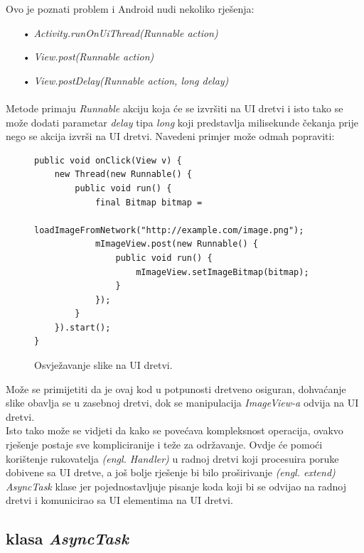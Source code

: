 \documentclass[times, utf8, zavrsni]{fer}
\begin{document}
Ovo je poznati problem i Android nudi nekoliko rješenja:

\begin{itemize}
\item[•] \textit{Activity.runOnUiThread(Runnable action)}
\item[•] \textit{View.post(Runnable action)}
\item[•] \textit{View.postDelay(Runnable action, long delay)}
\end{itemize}
\paragraph{}
Metode primaju \textit{Runnable} akciju koja će se izvršiti na UI dretvi i isto tako se može dodati parametar \textit{delay} tipa \textit{long} koji predstavlja milisekunde čekanja prije nego se akcija izvrši na UI dretvi.\newpage 
Navedeni primjer može odmah popraviti:

\begin{figure}[ht!]
\begin{lstlisting}
public void onClick(View v) {
    new Thread(new Runnable() {
        public void run() {
            final Bitmap bitmap =
                    loadImageFromNetwork("http://example.com/image.png");
            mImageView.post(new Runnable() {
                public void run() {
                    mImageView.setImageBitmap(bitmap);
                }
            });
        }
    }).start();
}
\end{lstlisting}
\caption{Osvježavanje slike na UI dretvi.}
\label{overflow}
\end{figure}

Može se primijetiti da je ovaj kod u potpunosti dretveno osiguran, dohvaćanje slike obavlja se u zasebnoj dretvi, dok se manipulacija \textit{ImageView-a} odvija na UI dretvi.\\

Isto tako može se vidjeti da kako se povećava kompleksnost operacija, ovakvo rješenje postaje sve kompliciranije i teže za održavanje. Ovdje će pomoći korištenje rukovatelja \textit{(engl. Handler)} u radnoj dretvi koji procesuira poruke dobivene sa UI dretve, a još bolje rješenje bi bilo proširivanje \textit{(engl. extend)} \textit{AsyncTask} klase jer pojednostavljuje pisanje koda koji bi se odvijao na radnoj dretvi i komunicirao sa UI elementima na UI dretvi.

\subsection{klasa \textit{AsyncTask}}
\end{document}
